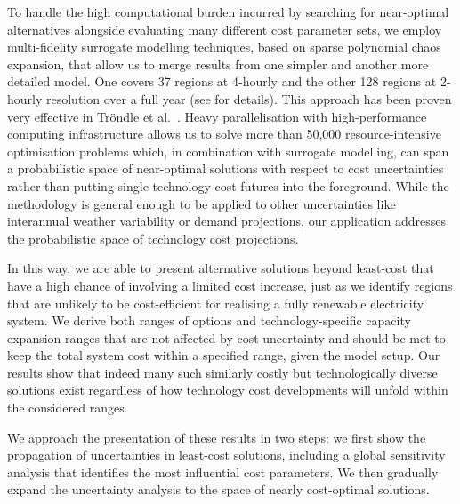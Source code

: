 
To handle the high computational burden incurred by searching for near-optimal
alternatives alongside evaluating many different cost parameter sets, we employ
multi-fidelity surrogate modelling techniques, based on sparse polynomial chaos
expansion, that allow us to merge results from one simpler and another more
detailed model. One covers 37 regions at 4-hourly and the other 128 regions at
2-hourly resolution over a full year (see  for
details). This approach has been proven very effective in Tröndle et
al.~\cite{trondle_trade-offs_2020}. Heavy parallelisation with high-performance
computing infrastructure allows us to solve more than 50,000 resource-intensive
optimisation problems which, in combination with surrogate modelling, can span a
probabilistic space of near-optimal solutions with respect to cost uncertainties
rather than putting single technology cost futures into the foreground. While
the methodology is general enough to be applied to other uncertainties like
interannual weather variability or demand projections, our application addresses
the probabilistic space of technology cost projections.



In this way, we are able to present alternative solutions beyond least-cost that
have a high chance of involving a limited cost increase, just as we identify
regions that are unlikely to be cost-efficient for realising a fully renewable
electricity system. We derive both ranges of options and technology-specific
capacity expansion ranges that are not affected by cost uncertainty and should
be met to keep the total system cost within a specified range, given the model
setup. Our results show that indeed many such similarly costly but
technologically diverse solutions exist regardless of how technology cost
developments will unfold within the considered ranges.

We approach the presentation of these results in two steps: we first show the
propagation of uncertainties in least-cost solutions, including a global
sensitivity analysis that identifies the most influential cost parameters. We
then gradually expand the uncertainty analysis to the space of nearly
cost-optimal solutions.




